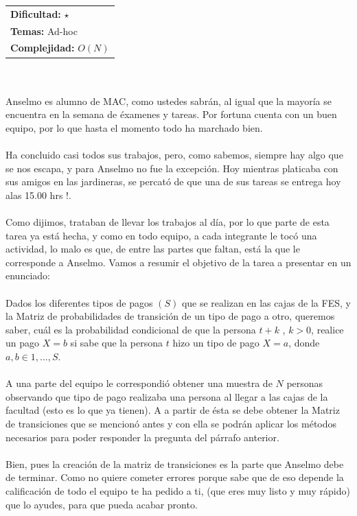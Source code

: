 \documentclass[12pt]{article}
\begin{document}
\hfill
\begin{tabular}{@{}l@{}}
\textbf{Dificultad:} $\star$ \\
\textbf{Temas:} Ad-hoc \\
\textbf{Complejidad:} $O(N)$
\end{tabular}\\
\\
Anselmo es alumno de MAC, como ustedes sabrán, al igual que la mayoría se encuentra en la semana de éxamenes y tareas. Por fortuna cuenta con un buen equipo, por lo que hasta el momento todo ha marchado bien.\\
\\Ha concluido casi todos sus trabajos, pero, como sabemos, siempre hay algo que se nos escapa, y para Anselmo no fue la excepción. Hoy mientras platicaba con sus amigos en las jardineras, se percató de que una de sus tareas se entrega hoy alas 15.00 hrs !.\\ \\Como dijimos, trataban de llevar los trabajos al día, por lo que parte de esta tarea ya está hecha, y como en todo equipo, a cada integrante le tocó una actividad, lo malo es que, de entre las partes que faltan, está la que le corresponde a Anselmo. Vamos a resumir el objetivo de la tarea a presentar en un enunciado:\\
\\Dados los diferentes tipos de pagos $(S)$ que se realizan en las cajas de la FES, y la Matriz de probabilidades de transición de un tipo de pago a otro, queremos saber, cuál es la probabilidad condicional de que la persona $t + k$ , $k > 0$, realice un pago $X = b$ si sabe que la persona $t$ hizo un tipo de pago $X = a$, donde $a, b ∈ {1, . . . , S}$.\\
\\A una parte del equipo le correspondió obtener una muestra de $N$ personas observando que tipo de pago realizaba una persona al llegar a las cajas de la facultad (esto es lo que ya tienen). A a partir de ésta se debe obtener la Matriz de transiciones que se mencionó antes y con ella se podrán aplicar los métodos necesarios para poder responder la pregunta del párrafo anterior.\\
\\Bien, pues la creación de la matriz de transiciones es la parte que Anselmo debe de terminar. Como no quiere cometer errores porque sabe que de eso depende la calificación de todo el equipo te ha pedido a ti, (que eres muy listo y muy rápido) que lo ayudes, para que pueda acabar pronto.\\
\end{document}
